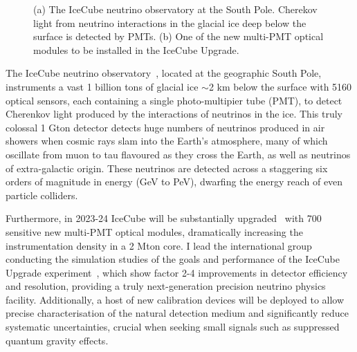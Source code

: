 \documentclass[a4paper,11pt]{article}
\begin{document}
\begin{figure}
\begin{subfigure}[c]{0.35\textwidth}
    \caption{\label{fig:mDOM}}
    \end{subfigure}
    \caption{(a) The IceCube neutrino observatory at the South Pole. Cherekov light from neutrino interactions in the glacial ice deep below the surface is detected by PMTs. (b) One of the new multi-PMT optical modules to be installed in the IceCube Upgrade.}
\end{figure}

The IceCube neutrino observatory~\cite{Aartsen_2017}, located at the geographic South Pole, instruments a vast 1 billion tons of glacial ice $\sim$2 km below the surface with 5160 optical sensors, each containing a single photo-multipier tube (PMT), to detect Cherenkov light produced by the interactions of neutrinos in the ice. This truly colossal 1 Gton detector detects huge numbers of neutrinos produced in air showers when cosmic rays slam into the Earth's atmosphere, many of which oscillate from muon to tau flavoured as they cross the Earth, as well as neutrinos of extra-galactic origin. These neutrinos are detected across a staggering six orders of magnitude in energy (GeV to PeV), dwarfing the energy reach of even particle colliders. 




Furthermore, in 2023-24 IceCube will be substantially upgraded~\cite{IceCubeUpgrade_ICRC2019} with 700 sensitive new multi-PMT optical modules, dramatically increasing the instrumentation density in a 2 Mton core. I lead the international group conducting the simulation studies of the goals and performance of the IceCube Upgrade experiment~\cite{IceCubeUpgrade_ICRC2019, NuFactProceedings}, which show factor 2-4 improvements in detector efficiency and resolution, providing a truly next-generation precision neutrino physics facility. Additionally, a host of new calibration devices will be deployed to allow precise characterisation of the natural detection medium and significantly reduce systematic uncertainties, crucial when seeking small signals such as suppressed quantum gravity effects.\\
\end{document}
